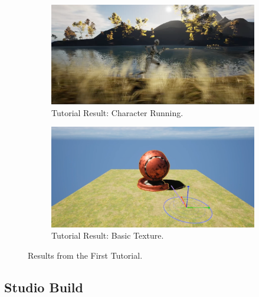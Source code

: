 \documentclass[
  a4paper,  %
  twoside,  %
  bibliography=totoc,
  headsepline,
  cleardoublepage=empty,
  parskip=half,
  draft=false
]{scrbook}
\begin{document}
\begin{figure}[h]
  \begin{subfigure}{0.45\textwidth}
    \includegraphics[width=\linewidth]{graphics/unreal-engine/Basics/Landscape-running.png}
    \caption{Tutorial Result: Character Running.}
  \end{subfigure}
  \begin{subfigure}{0.45\textwidth}
    \includegraphics[width=\linewidth]{graphics/unreal-engine/Basics/Texture.png}
    \caption{Tutorial Result: Basic Texture.}
  \end{subfigure}
  \caption{Results from the First Tutorial.}
  \label{fig:ue-basic-tutorial}
\end{figure}

\subsection*{Studio Build}
\end{document}
